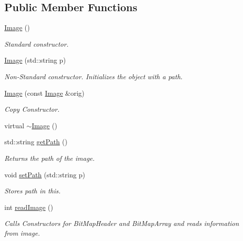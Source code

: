 \subsection*{Public Member Functions}
\begin{DoxyCompactItemize}
\item 
\mbox{\hyperlink{classImage_a58edd1c45b4faeb5f789b0d036d02313}{Image}} ()
\begin{DoxyCompactList}\small\item\em Standard constructor. \end{DoxyCompactList}\item 
\mbox{\hyperlink{classImage_a68ad10640a0b06d29c315cfff1ce5623}{Image}} (std\+::string p)
\begin{DoxyCompactList}\small\item\em Non-\/\+Standard constructor. Initializes the object with a path. \end{DoxyCompactList}\item 
\mbox{\hyperlink{classImage_abda271aa11b907dda8c8c8176684227d}{Image}} (const \mbox{\hyperlink{classImage}{Image}} \&orig)
\begin{DoxyCompactList}\small\item\em Copy Constructor. \end{DoxyCompactList}\item 
virtual \mbox{\hyperlink{classImage_a0294f63700543e11c0f0da85601c7ae5}{$\sim$\+Image}} ()
\item 
std\+::string \mbox{\hyperlink{classImage_a885989eb723cb0a1fc0555c7e8de817e}{get\+Path}} ()
\begin{DoxyCompactList}\small\item\em Returns the path of the image. \end{DoxyCompactList}\item 
void \mbox{\hyperlink{classImage_aabb8cec47c25c0e3a36ba2a455c2aa6c}{set\+Path}} (std\+::string p)
\begin{DoxyCompactList}\small\item\em Stores path in this. \end{DoxyCompactList}\item 
int \mbox{\hyperlink{classImage_ac0aa1f41cb368d87b20dd38839218d93}{read\+Image}} ()
\begin{DoxyCompactList}\small\item\em Calls Constructors for Bit\+Map\+Header and Bit\+Map\+Array and reads information from image. \end{DoxyCompactList}\item 

\end{DoxyCompactItemize}
